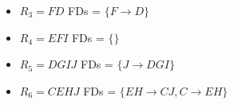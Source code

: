 \documentclass[12pt]{article}
\begin{document}
\begin{enumerate}
\begin{itemize}
    \item $R_3 = FD$ \newline
    FDs = $\{ F \rightarrow D\}$
    \item $R_4 = EFI$\newline
    FDs = $\{\}$
    \item $R_5 = DGIJ$ \newline
    FDs = $\{ J \rightarrow DGI\}$
    \item $R_6 = CEHJ$\newline
    FDs = $\{ EH \rightarrow CJ, C \rightarrow EH\}$
\end{itemize} 
\begin{comment}
  No because all relations are in BCNF. \\
    By projecting the FDs $S_T$ on to each relation we can check if each relation violates BCNF\\
    \newpage
    \begin{itemize}
      \item $Proj(S_T, \{K, M\})$:\\
      $M^+ = {MJKIL}$\\
      $K^+ = {KIJL}$\\
      so,$Proj(S_T, R_1)$: $M \rightarrow J$\\
      \item $Proj(S_T, \{K,N,M\})$:\\
      $K^+ = {KIJL}$\\
      $N^+ = {N}$\\
      $M^+ = {MJKIL}$\\
      $KN^+ = {KNMIJL}$\\
      $KM^+ = {KMJIL}$\\
      $NM^+ = {NMJK}$\\
      so,$Proj(S_T, R_1)$: $\{KN \rightarrow M, NM \rightarrow K\}$\\
      \item $Proj(S_T, \{K, I, J, L\})$:\\
      $K^+ = {KIJL}$ ; dont consider supersets of K\\
      $I^+ = {I}$\\
      $J^+ = {JKIL}$; dont consider supersets of J\\
      $L^+ = {L}$\\
      so,$Proj(S_T, R_1)$: $ \{K \rightarrow IJL, J \rightarrow KIL\}$\\
      \item $Proj(S_T, \{N, O, P, K\})$:\\

\end{comment}
\end{enumerate}
\end{document}
